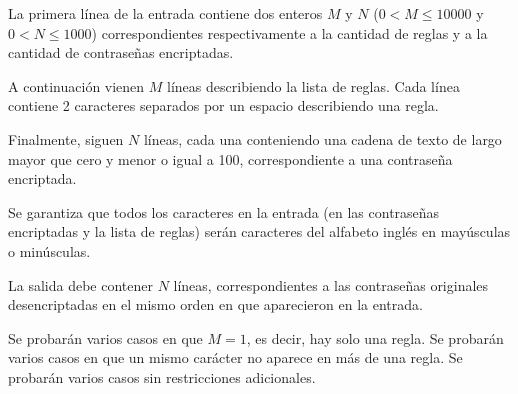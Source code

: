 \documentclass{oci}
\begin{document}
\begin{inputDescription}
  La primera línea de la entrada contiene dos enteros $M$ y $N$
  ($0 < M \leq 10000$ y $0 < N \leq 1000$) correspondientes respectivamente a la cantidad
  de reglas y a la cantidad de contraseñas encriptadas.

  A continuación vienen $M$ líneas describiendo la lista de reglas.
  Cada línea contiene 2 caracteres separados por un espacio describiendo una regla.

  Finalmente, siguen $N$ líneas, cada una conteniendo una cadena de texto de largo mayor que cero
  y menor o igual a 100, correspondiente a una contraseña encriptada.

  Se garantiza que todos los caracteres en la entrada (en las contraseñas encriptadas y la lista
  de reglas) serán caracteres del alfabeto inglés en mayúsculas o minúsculas.
\end{inputDescription}

\begin{outputDescription}
  La salida debe contener $N$ líneas, correspondientes a las contraseñas
  originales desencriptadas en el mismo orden en que aparecieron en la entrada.
\end{outputDescription}

\begin{scoreDescription}
  Se probarán varios casos en que $M=1$, es decir, hay solo una regla.
  Se probarán varios casos en que un mismo carácter no aparece en más de una regla.
  Se probarán varios casos sin restricciones adicionales.
\end{scoreDescription}

\begin{sampleDescription}
\end{sampleDescription}
\end{document}
